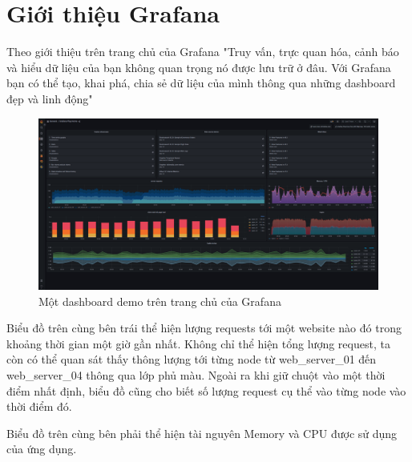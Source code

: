 \section{Giới thiệu Grafana}
Theo giới thiệu trên trang chủ của Grafana
"Truy vấn, trực quan hóa, cảnh báo và hiểu dữ liệu của bạn không quan trọng nó được lưu trữ ở đâu. Với Grafana bạn có thể tạo, khai phá, chia sẻ dữ liệu của mình thông qua những dashboard đẹp và linh động"
\begin{figure}[H] %
    \centering %
    \includegraphics[width=1\textwidth]{figures/fig_01.png} 
    \caption{Một dashboard demo trên trang chủ của Grafana} %
    \label{fig:fig_01}
\end{figure}
Biểu đồ trên cùng bên trái thể hiện lượng requests tới một website nào đó trong khoảng thời gian một giờ gần nhất. Không chỉ thể hiện tổng lượng request, ta còn có thể quan sát thấy thông lượng tới từng node từ web\_server\_01 đến web\_server\_04 thông qua lớp phủ màu. Ngoài ra khi giữ chuột vào một thời điểm nhất định, biểu đồ cũng cho biết số lượng request cụ thể vào từng node vào thời điểm đó. 

Biểu đồ trên cùng bên phải thể hiện tài nguyên Memory và CPU được sử dụng của ứng dụng. 
